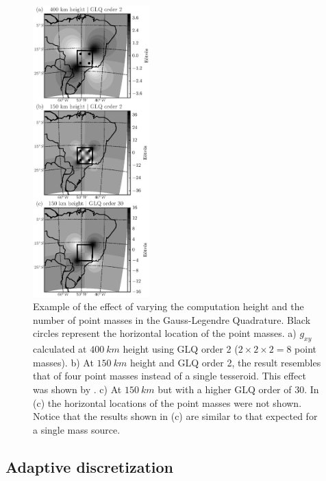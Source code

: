 \documentclass[manuscript,endfloat]{geophysics}
\begin{document}
\begin{figure}
    \centering
    \includegraphics[width=0.4\textwidth]{figs/vary-height-and-order}
    \caption{
        Example of the effect of varying
        the computation height
        and the number of point masses in the Gauss-Legendre Quadrature.
        Black circles represent the horizontal location of the point masses.
        a) $g_{xy}$ calculated at $400\ km$ height using GLQ order 2
        ($2 \times 2 \times 2 = 8$ point masses).
        b) At $150\ km$ height and GLQ order 2,
        the result resembles that of
        four point masses instead of a single tesseroid.
        This effect was shown by \citet{Ku1977}.
        c) At $150\ km$ but with a higher GLQ order of 30.
        In (c) the horizontal locations of the point masses were not shown.
        Notice that the results shown in (c) are similar to that expected
        for a single mass source.
    }
    \label{fig:glqerrorsample}
\end{figure}


\subsection{Adaptive discretization}
\end{document}
